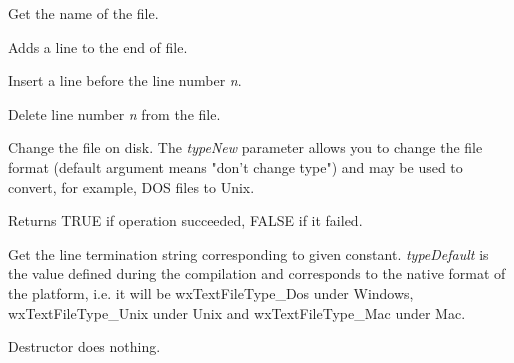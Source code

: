 Get the name of the file.

\label{wxtextfileaddline}


Adds a line to the end of file.

\label{wxtextfileinsertline}


Insert a line before the line number {\it n}.

\label{wxtextfileremoveline}


Delete line number {\it n} from the file.

\label{wxtextfilewrite}


Change the file on disk. The {\it typeNew} parameter allows you to change the
file format (default argument means "don't change type") and may be used to
convert, for example, DOS files to Unix.

Returns TRUE if operation succeeded, FALSE if it failed.

\label{wxtextfilegeteol}


Get the line termination string corresponding to given constant. {\it typeDefault} is
the value defined during the compilation and corresponds to the native format of the
platform, i.e. it will be wxTextFileType\_Dos under Windows, wxTextFileType\_Unix under
Unix and wxTextFileType\_Mac under Mac.

\label{wxtextfiledtor}


Destructor does nothing.

